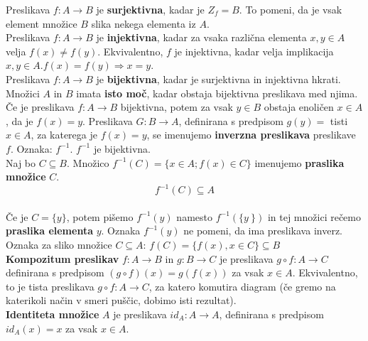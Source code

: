 \documentclass[a4paper,12pt]{article}
\begin{document}
Preslikava $f: A \to B$ je \textbf{surjektivna}, kadar je $Z_f = B$. To pomeni, da je vsak element množice $B$ slika nekega elementa iz $A$. \\

Preslikava $f: A \to B$ je \textbf{injektivna}, kadar za vsaka različna elementa $x,y \in A$ velja \linebreak $f(x) \neq f(y)$. Ekvivalentno, $f$ je injektivna, kadar velja implikacija $x,y \in A. f(x) = f(y) \Rightarrow x = y$. \\

Preslikava $f: A \to B$ je \textbf{bijektivna}, kadar je surjektivna in injektivna hkrati. \\

Množici $A$ in $B$ imata \textbf{isto moč}, kadar obstaja bijektivna preslikava med njima. \\

Če je preslikava $f: A \to B$ bijektivna, potem za vsak $y \in B$ obstaja enoličen $x \in A$, da je $f(x) = y$. Preslikava $G: B \to A$, definirana s predpisom $g(y) =$ tisti $x \in A$, za katerega je $f(x) = y$, se imenujemo \textbf{inverzna preslikava} preslikave $f$. Oznaka: $f^{-1}$. $f^{-1}$ je bijektivna. \\

Naj bo $C \subseteq B$. Množico $f^{-1}(C)=\{x \in A ; f(x) \in C \}$ imenujemo \textbf{praslika množice} $C$. $$f^{-1}(C) \subseteq A$$ \\

Če je $C=\{y\}$, potem pišemo $f^{-1}(y)$ namesto $f^{-1}(\{y~\})$ in tej množici rečemo \textbf{praslika elementa} $y$. Oznaka $f^{-1}(y)$ ne pomeni, da ima preslikava inverz. \\

Oznaka za sliko množice $C \subseteq A$: $f(C) = \{f(x), x \in C \} \subseteq B$ \\

\textbf{Kompozitum preslikav} $f: A \to B$ in $g: B \to C$ je preslikava $g \circ f : A \to C$ \linebreak definirana s predpisom $(g \circ f)(x) = g(f(x))$ za vsak $x \in A$. Ekvivalentno, to je tista preslikava $g \circ f: A \to C$, za katero komutira diagram (če gremo na katerikoli način v smeri puščic, dobimo isti rezultat). \\

\textbf{Identiteta množice} $A$ je preslikava $id_A: A \to A$, definirana s predpisom $id_A(x) = x$ za vsak $x \in A$. \\
\end{document}
